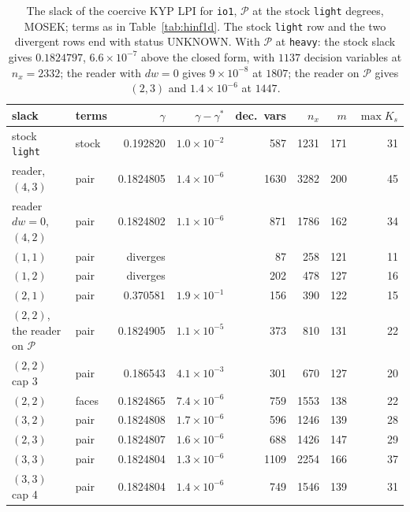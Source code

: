 \documentclass[12pt]{article}
\newcommand{\mcl}[1]{\mathcal{#1}}
\newcommand{\code}[1]{\texttt{#1}}
\theoremstyle{plain}
\theoremstyle{definition}
\theoremstyle{remark}
\begin{document}
\begin{table}[h]\centering\footnotesize
\setlength{\tabcolsep}{5pt}
\begin{tabular}{llrrrrrr}
\toprule
slack & terms & $\gamma$ & $\gamma-\gamma^*$ & dec.\ vars & $n_x$ & $m$ & $\max K_s$ \\
\midrule
stock \code{light} & stock & 0.192820 & $1.0\times10^{-2}$ & 587 & 1231 & 171 & 31 \\
reader, $(4,3)$ & pair & 0.1824805 & $1.4\times10^{-6}$ & 1630 & 3282 & 200 & 45 \\
reader $dw=0$, $(4,2)$ & pair & 0.1824802 & $1.1\times10^{-6}$ & 871 & 1786 & 162 & 34 \\
$(1,1)$ & pair & diverges & & 87 & 258 & 121 & 11 \\
$(1,2)$ & pair & diverges & & 202 & 478 & 127 & 16 \\
$(2,1)$ & pair & 0.370581 & $1.9\times10^{-1}$ & 156 & 390 & 122 & 15 \\
$(2,2)$, the reader on $\mcl P$ & pair & 0.1824905 & $1.1\times10^{-5}$ & 373 & 810 & 131 & 22 \\
$(2,2)$ cap 3 & pair & 0.186543 & $4.1\times10^{-3}$ & 301 & 670 & 127 & 20 \\
$(2,2)$ & faces & 0.1824865 & $7.4\times10^{-6}$ & 759 & 1553 & 138 & 22 \\
$(3,2)$ & pair & 0.1824808 & $1.7\times10^{-6}$ & 596 & 1246 & 139 & 28 \\
$(2,3)$ & pair & 0.1824807 & $1.6\times10^{-6}$ & 688 & 1426 & 147 & 29 \\
$(3,3)$ & pair & 0.1824804 & $1.3\times10^{-6}$ & 1109 & 2254 & 166 & 37 \\
$(3,3)$ cap 4 & pair & 0.1824804 & $1.4\times10^{-6}$ & 749 & 1546 & 139 & 31 \\
\bottomrule
\end{tabular}
\caption{The slack of the coercive KYP LPI for \code{io1}, $\mcl P$ at the stock \code{light} degrees, MOSEK; terms as in Table~\ref{tab:hinf1d}. The stock \code{light} row and the two divergent rows end with status UNKNOWN. With $\mcl P$ at \code{heavy}: the stock slack gives $0.1824797$, $6.6\times10^{-7}$ above the closed form, with $1137$ decision variables at $n_x=2332$; the reader with $dw=0$ gives $9\times10^{-8}$ at $1807$; the reader on $\mcl P$ gives $(2,3)$ and $1.4\times10^{-6}$ at $1447$.}\label{tab:hinfco}
\end{table}
\end{document}

